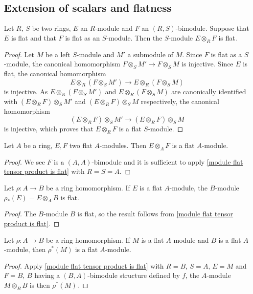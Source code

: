 \subsection{Extension of scalars and flatness}
\begin{proposition}\label{module flat tensor product is flat}
Let $R$, $S$ be two rings, $E$ an $R$-module and $F$ an $(R,S)$-bimodule. Suppose that $E$ is flat and that $F$ is flat as an $S$-module. Then the $S$-module $E\otimes_RF$ is flat.
\end{proposition}
\begin{proof}
Let $M$ be a left $S$-module and $M'$ a submodule of $M$. Since $F$ is flat as a $S$-module, the canonical homomorphism $F\otimes_SM'\to F\otimes_SM$ is injective. Since $E$ is flat, the canonical homomorphism
\[E\otimes_R(F\otimes_SM')\to E\otimes_R(F\otimes_SM)\]
is injective. As $E\otimes_R(F\otimes_SM')$ and $E\otimes_R(F\otimes_SM)$ are canonically identified with $(E\otimes_RF)\otimes_SM'$ and $(E\otimes_RF)\otimes_SM$ respectively, the canonical homomorphism
\[(E\otimes_RF)\otimes_SM'\to(E\otimes_RF)\otimes_SM\]
is injective, which proves that $E\otimes_RF$ is a flat $S$-module.
\end{proof}
\begin{corollary}\label{module flat tensor is flat}
Let $A$ be a ring, $E,F$ two flat $A$-modules. Then $E\otimes_AF$ is a flat $A$-module.
\end{corollary}
\begin{proof}
We see $F$ is a $(A,A)$-bimodule and it is sufficient to apply \cref{module flat tensor product is flat} with $R=S=A$.
\end{proof}
\begin{corollary}\label{module flat extension is flat}
Let $\rho:A\to B$ be a ring homomorphism. If $E$ is a flat $A$-module, the $B$-module $\rho_*(E)=E\otimes_AB$ is flat.
\end{corollary}
\begin{proof}
The $B$-module $B$ is flat, so the result follows from \cref{module flat tensor product is flat}.
\end{proof}
\begin{corollary}\label{module flat restriction is flat}
Let $\rho:A\to B$ be a ring homomorphism. If $M$ is a flat $A$-module and $B$ is a flat $A$-module, then $\rho^*(M)$ is a flat $A$-module.
\end{corollary}
\begin{proof}
Apply \cref{module flat tensor product is flat} with $R=B$, $S=A$, $E=M$ and $F=B$, $B$ having a $(B,A)$-bimodule structure defined by $f$, the $A$-module $M\otimes_BB$ is then $\rho^*(M)$.
\end{proof}
